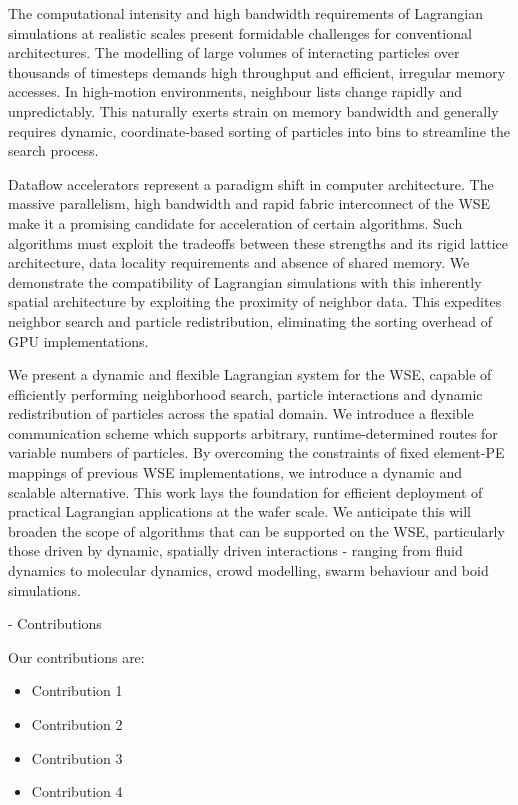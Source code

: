 \documentclass[review, anonymous, acmsmall]{acmart}
\begin{document}
The computational intensity and high bandwidth requirements of Lagrangian simulations at realistic scales present formidable challenges for conventional architectures.
The modelling of large volumes of interacting particles over thousands of timesteps demands high throughput and efficient, irregular memory accesses.
In high-motion environments, neighbour lists change rapidly and unpredictably. 
This naturally exerts strain on memory bandwidth and generally requires dynamic, coordinate-based sorting of particles into bins to streamline the search process.

Dataflow accelerators represent a paradigm shift in computer architecture.
The massive parallelism, high bandwidth and rapid fabric interconnect of the WSE make it a promising candidate for acceleration of certain algorithms.
Such algorithms must exploit the tradeoffs between these strengths and its rigid lattice architecture, data locality requirements and absence of shared memory.
We demonstrate the compatibility of Lagrangian simulations with this inherently spatial architecture by exploiting the proximity of neighbor data. 
This expedites neighbor search and particle redistribution, eliminating the sorting overhead of GPU implementations.

We present a dynamic and flexible Lagrangian system for the WSE, capable of efficiently performing neighborhood search, particle interactions and dynamic redistribution of particles across the spatial domain. 
We introduce a flexible communication scheme which supports arbitrary, runtime-determined routes for variable numbers of particles. 
By overcoming the constraints of fixed element-PE mappings of previous WSE implementations, we introduce a dynamic and scalable alternative. 
This work lays the foundation for efficient deployment of practical Lagrangian applications at the wafer scale. 
We anticipate this will broaden the scope of algorithms that can be supported on the WSE, particularly those driven by dynamic, spatially driven interactions - ranging from fluid dynamics to molecular dynamics, crowd modelling, swarm behaviour and boid simulations. 

- Contributions

\noindent
Our contributions are:
\begin{itemize}
	\item Contribution 1
	\item Contribution 2
	\item Contribution 3
	\item Contribution 4
\end{itemize}
\end{document}
